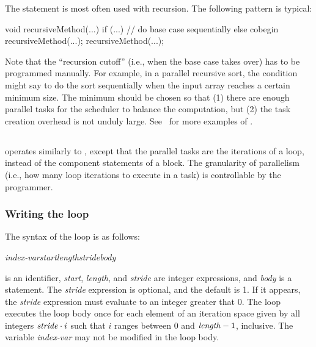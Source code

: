 The  statement is most often used with recursion.  The
following pattern is typical:
%
\begin{dpjlisting}
void recursiveMethod(...) {
  if (...) {
    // do base case sequentially
  } else {
    cobegin {
      recursiveMethod(...);
      recursiveMethod(...);
    }
  }
}
\end{dpjlisting}
%
Note that the ``recursion cutoff'' (i.e., when the base case takes
over) has to be programmed manually.  For example, in a parallel
recursive sort, the condition might say to do the sort sequentially
when the input array reaches a certain minimum size.  The minimum
should be chosen so that (1) there are enough parallel tasks for the
scheduler to balance the computation, but (2) the task creation
overhead is not unduly large.  See \tutorial\ for more
examples of .

\subsection{%
\label{sec:parallel:foreach}}

 operates similarly to , except that the
parallel tasks are the iterations of a loop, instead of the component
statements of a block.  The granularity of parallelism (i.e., how many
loop iterations to execute in a task) is controllable by the
programmer.

\subsubsection{Writing the  loop%
\label{sec:parallel:foreach:writing}}

The syntax of the  loop is as follows:
%
\begin{description}
\item {}\emph{index-var}\emph{start}\kwd{, }\emph{length}\kwd{,
    }\emph{stride}\kwd{) }\emph{body}\kwd{;}
\end{description}
%
 is an identifier, \emph{start}, \emph{length}, and
\emph{stride} are integer expressions, and \emph{body} is a statement.
The \emph{stride} expression is optional, and the default is 1. If it
appears, the \emph{stride} expression must evaluate to an integer
greater that 0.  The  loop executes the loop body once
for each element of an iteration space given by all integers
$\mbox{\textit{stride}} \cdot i$ such that $i$ ranges between $0$ and
$\mbox{\textit{length}}-1$, inclusive.  The variable \emph{index-var} may
not be modified in the loop body.

